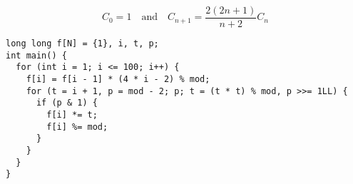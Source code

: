 \[C_0 = 1 \quad \mbox{and} \quad C_{n+1}=\frac{2(2n+1)}{n+2}C_n\]
\begin{lstlisting}
long long f[N] = {1}, i, t, p;
int main() {
  for (int i = 1; i <= 100; i++) {
    f[i] = f[i - 1] * (4 * i - 2) % mod;
    for (t = i + 1, p = mod - 2; p; t = (t * t) % mod, p >>= 1LL) {
      if (p & 1) {
        f[i] *= t;
        f[i] %= mod;
      }
    }
  }
}
\end{lstlisting}